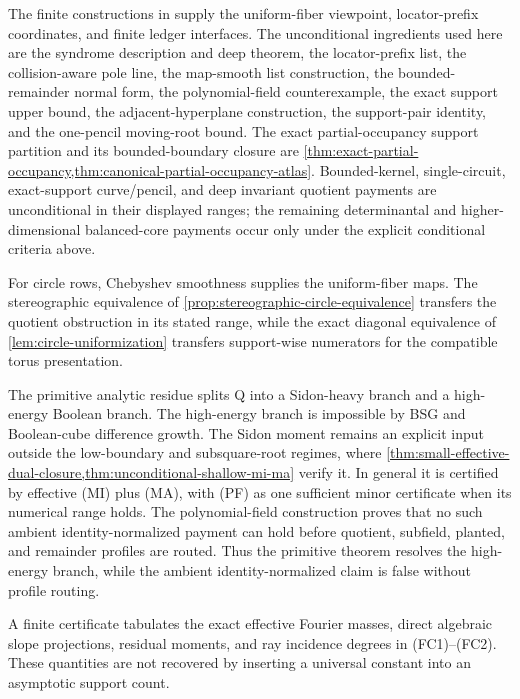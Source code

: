 \documentclass[12pt,a4paper]{amsart}
\numberwithin{equation}{section}
\theoremstyle{remark}
\begin{document}
The finite constructions in \cite{Cho26CapV13,Cho26Grande} supply the
uniform-fiber viewpoint, locator-prefix coordinates, and finite ledger
interfaces.  The unconditional ingredients used here are the syndrome
description and deep theorem, the locator-prefix list, the collision-aware
pole line, the map-smooth list construction, the bounded-remainder normal
form, the polynomial-field counterexample, the exact support upper bound,
the adjacent-hyperplane construction, the support-pair identity, and the
one-pencil moving-root bound.  The exact partial-occupancy support
partition and its bounded-boundary closure are
\cref{thm:exact-partial-occupancy,thm:canonical-partial-occupancy-atlas}.
Bounded-kernel, single-circuit, exact-support curve/pencil, and deep
invariant quotient payments are unconditional in their displayed ranges;
the remaining determinantal and higher-dimensional balanced-core payments
occur only under the explicit conditional criteria above.

For circle rows, Chebyshev smoothness supplies the uniform-fiber maps.
The stereographic equivalence of
\cref{prop:stereographic-circle-equivalence} transfers the quotient
obstruction in its stated range, while the exact diagonal equivalence of
\cref{lem:circle-uniformization} transfers support-wise numerators for the
compatible torus presentation.

The primitive analytic residue splits Q into a Sidon-heavy branch and a
high-energy Boolean branch.  The high-energy branch is impossible by BSG
and Boolean-cube difference growth.  The Sidon moment remains an explicit
input outside the low-boundary and subsquare-root regimes, where
\cref{thm:small-effective-dual-closure,thm:unconditional-shallow-mi-ma}
verify it.  In general it is certified by effective \textup{(MI)} plus
\textup{(MA)}, with \textup{(PF)} as one
sufficient minor certificate when its numerical range holds.  The
polynomial-field construction proves that no such ambient
identity-normalized payment can hold before quotient, subfield, planted,
and remainder profiles are routed.  Thus the primitive theorem resolves
the high-energy branch, while the ambient identity-normalized claim is
false without profile routing.

A finite certificate tabulates the exact effective Fourier masses, direct
algebraic slope projections, residual moments, and ray incidence degrees
in \textup{(FC1)}--\textup{(FC2)}.  These quantities are not recovered by
inserting a universal constant into an asymptotic support count.
\end{document}
